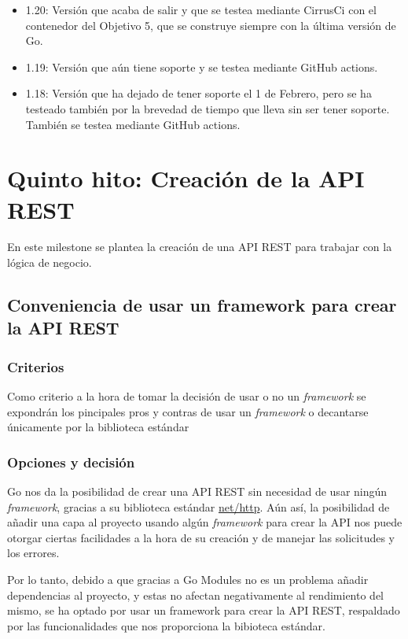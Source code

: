 \begin{itemize}
\item
  1.20: Versión que acaba de salir y que se testea mediante CirrusCi con
  el contenedor del Objetivo 5, que se construye siempre con la última
  versión de Go.
\item
  1.19: Versión que aún tiene soporte y se testea mediante GitHub
  actions.
\item
  1.18: Versión que ha dejado de tener soporte el 1 de Febrero, pero se
  ha testeado también por la brevedad de tiempo que lleva sin ser tener
  soporte. También se testea mediante GitHub actions.
\end{itemize}

\newpage
\section{Quinto hito: Creación de la API REST}

En este milestone se plantea la creación de una API REST para trabajar con la lógica de negocio.

\subsection{Conveniencia de usar un framework para crear la API REST}

\subsubsection{Criterios}

Como criterio a la hora de tomar la decisión de usar o no un \textit{framework} se expondrán los pincipales pros y contras de usar un \textit{framework} o decantarse únicamente por la biblioteca estándar

\subsubsection{Opciones y decisión}

Go nos da la posibilidad de crear una API REST sin necesidad de usar ningún \textit{framework}, gracias a su biblioteca estándar \href{https://pkg.go.dev/net/http}{net/http}.
Aún así, la posibilidad de añadir una capa al proyecto usando algún \textit{framework} para crear la API nos puede otorgar ciertas facilidades a la hora de su creación y de manejar las solicitudes y los errores.

Por lo tanto, debido a que gracias a Go Modules no es un problema añadir dependencias al proyecto, y estas no afectan negativamente al rendimiento del mismo, se ha optado por usar
un framework para crear la API REST, respaldado por las funcionalidades que nos proporciona la bibioteca estándar.

